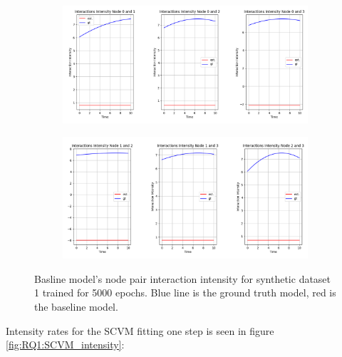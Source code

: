 \begin{figure}[H]
    \centering
    \begin{subfigure}[b]{\textwidth}
        \centering
        \includegraphics[width=\textwidth]{0_images/rq1_baseline_intensity_plot1.png}
    \end{subfigure}
    \vfill
    \begin{subfigure}[b]{\textwidth}
        \centering
        \includegraphics[width=\textwidth]{0_images/rq1_baseline_intensity_plot2.png}
    \end{subfigure}
    \caption{Basline model's node pair interaction intensity for synthetic dataset 1 trained for 5000 epochs. Blue line is the ground truth model, red is the baseline model.}
    \label{fig:RQ1:baseline_intensity}
\end{figure}
\clearpage
\noindent
Intensity rates for the SCVM fitting one step is seen in figure \ref{fig:RQ1:SCVM_intensity}:
